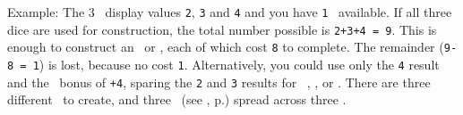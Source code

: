 Example: The 3 \whitedice\ display values \texttt{2}, \texttt{3} and \texttt{4} and you have \texttt{1} \greatperson\ available.  
If all three dice are used for construction, the total number possible is \texttt{2+3+4 = 9}.  
This is enough to construct an \academy\ or \factory, each of which cost \texttt{8} to complete.  
The remainder (\texttt{9-8 = 1}) is lost, because no \armaments cost \texttt{1}. 
Alternatively, you could use only the \texttt{4} result and the \greatperson\ bonus of \texttt{+4}, sparing the \texttt{2} and \texttt{3} results for \activating\ \armaments, \trade, or \culture.
\newline\newline
There are three different \armaments\ to create, and three \armaments\ (see , p.\pageref{sec:armaments}) spread across three \levels.
